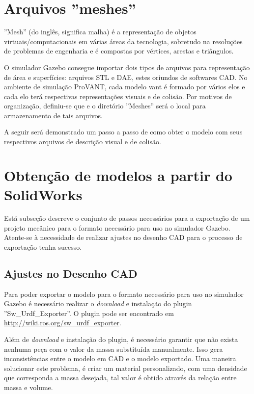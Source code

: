 \section{Arquivos ''meshes''}

''Mesh'' (do inglês, significa malha) é a representação de objetos virtuais/computacionais em várias áreas da tecnologia, sobretudo na resoluções de problemas de engenharia e é compostas por vértices, arestas e triângulos.

O simulador Gazebo consegue importar dois tipos de arquivos para representação de área e superfícies: arquivos STL e DAE, estes oriundos de softwares CAD. No ambiente de simulação ProVANT, cada modelo vant é formado por vários elos e cada elo terá respectivas representações visuais e de colisão. Por motivos de organização, definiu-se que e o diretório ''Meshes'' será o local para armazenamento de tais arquivos.

A seguir será demonstrado um passo a passo de como obter o modelo com seus respectivos arquivos de descrição visual e de colisão.    

\section{Obtenção de modelos a partir do SolidWorks}

Está subseção descreve o conjunto de passos necessários para a exportação de um projeto mecânico para o formato necessário para uso no simulador Gazebo. Atente-se à necessidade de realizar ajustes no desenho CAD para o processo de exportação tenha sucesso. 

\subsection{Ajustes no Desenho CAD }

Para poder exportar o modelo para o formato necessário para uso no simulador Gazebo é necessário realizar o \textit{download} e instalação do plugin ''Sw\_Urdf\_Exporter''. O plugin pode ser encontrado em \url{http://wiki.ros.org/sw_urdf_exporter}. 

Além de \textit{download} e instalação do plugin, é necessário garantir que não exista nenhuma peça com o valor da massa substituída manualmente. Isso gera inconsistências entre o modelo em CAD e o modelo exportado. Uma maneira solucionar este problema, é criar um material personalizado, com uma densidade que corresponda a massa desejada, tal valor é obtido através da relação entre massa e volume.

